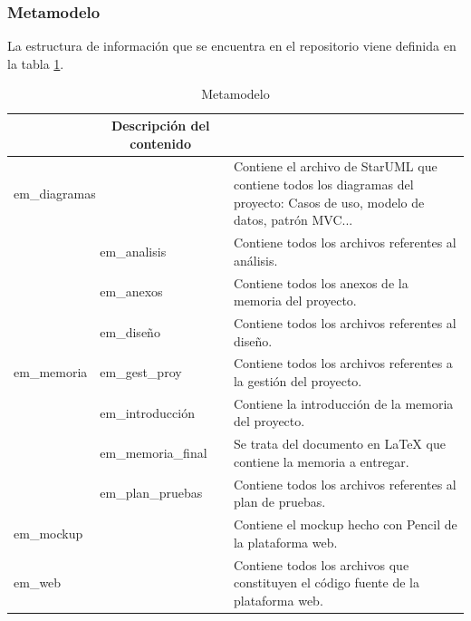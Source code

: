\subsubsection{Metamodelo}
La estructura de información que se encuentra en el repositorio viene definida en la tabla \ref{tab_metamodelo}.

\begin{table}[htpb]
\centering
\begin{tabularx}{\textwidth}{|l|l|X|}
\hline
\rowcolor[gray]{0.9}\multicolumn{2}{|c|}{\textbf{Carpeta}}                     & \multicolumn{1}{c|}{\textbf{Descripción del contenido}}                                                                             \\ \hline
\multicolumn{2}{|X|}{em\_diagramas}               & Contiene el archivo de StarUML que contiene todos los diagramas del proyecto: Casos de uso, modelo de datos, patrón MVC... \\ \hline
\multirow{7}{*}{em\_memoria} & em\_analisis       & Contiene todos los archivos referentes al análisis.                                                                        \\ \cline{2-3} 
                             & em\_anexos         & Contiene todos los anexos de la memoria del proyecto.                                                                      \\ \cline{2-3} 
                             & em\_diseño         & Contiene todos los archivos referentes al diseño.                                                                          \\ \cline{2-3} 
                             & em\_gest\_proy     & Contiene todos los archivos referentes a la gestión del proyecto.                                                          \\ \cline{2-3} 
                             & em\_introducción   & Contiene la introducción de la memoria del proyecto.                                                                       \\ \cline{2-3} 
                             & em\_memoria\_final & Se trata del documento en LaTeX que contiene la memoria a entregar.                                                        \\ \cline{2-3} 
                             & em\_plan\_pruebas  & Contiene todos los archivos referentes al plan de pruebas.                                                                 \\ \hline
\multicolumn{2}{|X|}{em\_mockup}                  & Contiene el mockup hecho con Pencil de la plataforma web.                                                                  \\ \hline
\multicolumn{2}{|X|}{em\_web}                     & Contiene todos los archivos que constituyen el código fuente de la plataforma web.                                         \\ \hline
\end{tabularx}
\caption{Metamodelo}
\label{tab_metamodelo}
\end{table}

